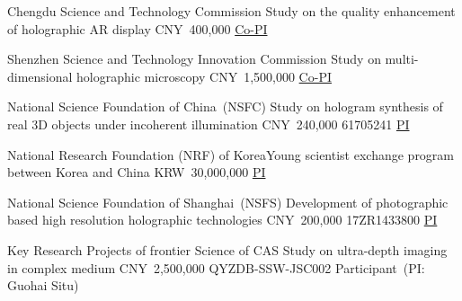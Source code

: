 \documentclass[10pt,a4paper]{moderncv}
\begin{document}
{Chengdu Science and Technology Commission}
{Study on the quality enhancement of holographic AR display}
{CNY~400,000}
{}
{\underline{Co-PI}}

{Shenzhen Science and Technology Innovation Commission}
{Study on multi-dimensional holographic microscopy}
{CNY~1,500,000}
{}
{\underline{Co-PI}}



{National Science Foundation of China~(NSFC)}
{Study on hologram synthesis of real 3D objects under incoherent illumination}
{CNY~24\textbf{}0,000}
{61705241}
{\underline{PI}}

{National Research Foundation (NRF) of Korea}{Young scientist exchange program between Korea and China}
{KRW~30,000,000}
{}
{\underline{PI}}

{National Science Foundation of Shanghai~(NSFS)}
{Development of photographic based \linebreak high resolution holographic technologies}
{CNY~200,000}
{17ZR1433800}
{\underline{PI}}


{Key Research Projects of frontier Science of CAS}
{Study on ultra-depth imaging in complex medium}
{CNY~2,500,000}
{QYZDB-SSW-JSC002}
{Participant~(PI: Guohai Situ)}

\end{document}
